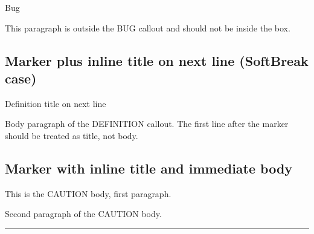 \begin{tcolorbox}[breakable,colback=ocGryBack,colframe=ocGryFrame,coltitle=ocGryTitle,left=3mm,boxed title style={left=1mm},title={\hspace*{-2.5mm}\iconInfo\; md2pdf - inner without explicit \texttt{shift-heading=0}}]
\vspace{2mm}

\noindent\begin{tcolorbox}[colback=ocRed2Back,colframe=ocRed2Frame,coltitle=ocRed2Title,left=3mm,width=\linewidth,boxrule=0pt]

\hspace*{-2.5mm}\iconBug\; Bug

\end{tcolorbox}

This paragraph is outside the BUG callout and should not be inside the
box.

\subsection*{Marker plus inline title on next line (SoftBreak
case)}\label{inner-2-marker-plus-inline-title-on-next-line-softbreak-case}

\begin{tcolorbox}[breakable,colback=ocPinBack,colframe=ocPinFrame,coltitle=ocPinTitle,left=3mm,boxed title style={left=1mm},title={\hspace*{-2.5mm}\iconDefinition\; Definition}]

Definition title on next line

Body paragraph of the DEFINITION callout. The first line after the
marker should be treated as title, not body.

\end{tcolorbox}

\subsection*{Marker with inline title and immediate
body}\label{inner-2-marker-with-inline-title-and-immediate-body}

\begin{tcolorbox}[breakable,colback=ocOrgBack,colframe=ocOrgFrame,coltitle=ocOrgTitle,left=3mm,boxed title style={left=1mm},title={\hspace*{-2.5mm}\iconWarning\; Caution title}]

This is the CAUTION body, first paragraph.

Second paragraph of the CAUTION body.

\end{tcolorbox}

\begin{center}\rule{0.5\linewidth}{0.5pt}\end{center}


\end{tcolorbox}
